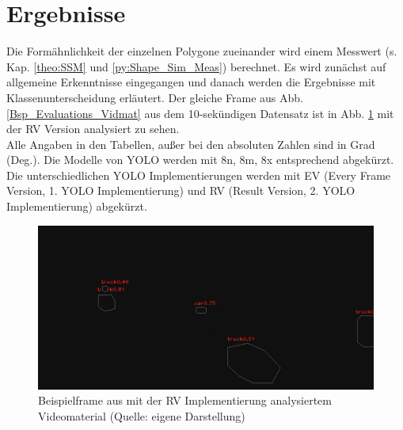 \section{Ergebnisse\label{sec:Ergebnisse}}  
{Die Formähnlichkeit der einzelnen Polygone zueinander wird einem Messwert  (s. Kap. \ref{theo:SSM} und \ref{py:Shape_Sim_Meas}) berechnet. Es wird zunächst auf allgemeine Erkenntnisse eingegangen und danach werden die Ergebnisse mit Klassenunterscheidung erläutert. Der gleiche Frame aus Abb. \ref{Bsp_Evaluations_Vidmat} aus dem 10-sekündigen Datensatz ist in Abb. \ref{Bsp_ErgebRVA10s_Vidmat} mit der RV Version analysiert zu sehen.\\
Alle Angaben in den Tabellen, außer bei den absoluten Zahlen sind in Grad (Deg.). Die Modelle von YOLO werden mit 8n, 8m, 8x entsprechend abgekürzt. Die unterschiedlichen YOLO Implementierungen werden mit EV (Every Frame Version, 1. YOLO Implementierung) und RV (Result Version, 2. YOLO Implementierung) abgekürzt.

\begin{figure}[ht]
	\centering
	\includegraphics*[scale = 0.25, keepaspectratio ]{images/Evaluation/Screenshot_A10s_RV.png}
	\caption[Beispielframe aus mit der RV Implementierung analysiertem Videomaterial]{Beispielframe aus mit der RV Implementierung analysiertem Videomaterial (Quelle: eigene Darstellung)} 
	\label{Bsp_ErgebRVA10s_Vidmat}
\end{figure}

}
